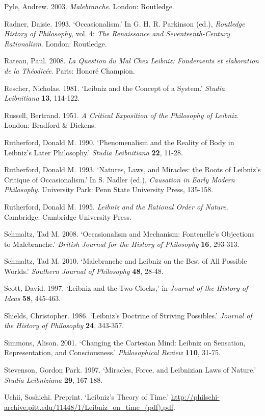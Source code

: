 \documentclass{article}
\begin{document}
Pyle, Andrew. 2003. \emph{Malebranche}. London: Routledge.

Radner, Daisie. 1993. `Occasionalism.' In G. H. R. Parkinson (ed.),
\emph{Routledge History of Philosophy}, vol. 4: \emph{The Renaissance
and Seventeenth-Century Rationalism}. London: Routledge.

Rateau, Paul. 2008. \emph{La Question du Mal Chez Leibniz: Fondements et
elaboration de la Théodicée}. Paris: Honoré Champion.

Rescher, Nicholas. 1981. `Leibniz and the Concept of a System.'
\emph{Studia Leibnitiana} \textbf{13}, 114-122.

Russell, Bertrand. 1951. \emph{A Critical Exposition of the Philosophy
of Leibniz.} London: Bradford \& Dickens.

Rutherford, Donald M. 1990. `Phenomenalism and the Reality of Body in
Leibniz's Later Philosophy.' \emph{Studia Leibnitiana} \textbf{22},
11-28.

Rutherford, Donald M. 1993. `Natures, Laws, and Miracles: the Roots of
Leibniz's Critique of Occasionalism.' In S. Nadler (ed.),
\emph{Causation in Early Modern Philosophy}. University Park: Penn State
University Press, 135-158.

Rutherford, Donald M. 1995. \emph{Leibniz and the Rational Order of
Nature}. Cambridge: Cambridge University Press.

Schmaltz, Tad M. 2008. `Occasionalism and Mechanism: Fontenelle's
Objections to Malebranche.' \emph{British Journal for the History of
Philosophy} \textbf{16}, 293-313.

Schmaltz, Tad M. 2010. `Malebranche and Leibniz on the Best of All
Possible Worlds.' \emph{Southern Journal of Philosophy} \textbf{48},
28-48.

Scott, David. 1997. `Leibniz and the Two Clocks,' in \emph{Journal of
the History of Ideas} \textbf{58}, 445-463.

Shields, Christopher. 1986. `Leibniz's Doctrine of Striving Possibles.'
\emph{Journal of the History of Philosophy} \textbf{24}, 343-357.

Simmons, Alison. 2001. `Changing the Cartesian Mind: Leibniz on
Sensation, Representation, and Consciousness.' \emph{Philosophical
Review} \textbf{110}, 31-75.

Stevenson, Gordon Park. 1997. `Miracles, Force, and Leibnizian Laws of
Nature.' \emph{Studia Leibniziana} \textbf{29}, 167-188.

Uchii, Soshichi. Preprint. `Leibniz's Theory of Time.'
\url{http://philschi-archive.pitt.edu/11448/1/Leibniz_on_time_(pdf).pdf}.
\end{document}
